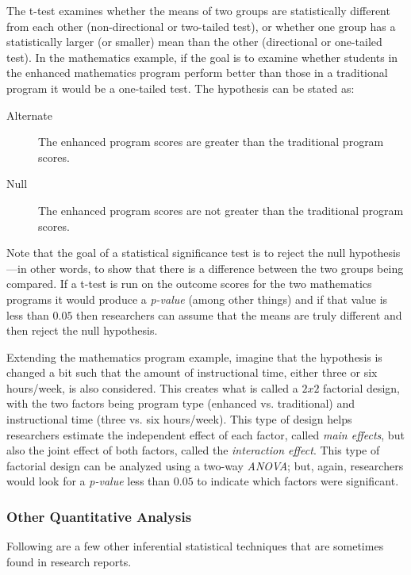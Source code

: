 The t-test examines whether the means of two groups are statistically different from each other (non-directional or two-tailed test), or whether one group has a statistically larger (or smaller) mean than the other (directional or one-tailed test). In the mathematics example, if the goal is to examine whether students in the enhanced mathematics program perform better than those in a traditional program it would be a one-tailed test. The hypothesis can be stated as:

\begin{description}
	\item[Alternate] The enhanced program scores are greater than the traditional program scores.
	\item[Null] The enhanced program scores are not greater than the traditional program scores.
\end{description}

Note that the goal of a statistical significance test is to reject the null hypothesis---in other words, to show that there is a difference between the two groups being compared. If a t-test is run on the outcome scores for the two mathematics programs it would produce a \textit{p-value} (among other things) and if that value is less than $ 0.05 $ then researchers can assume that the means are truly different and then reject the null hypothesis.

Extending the mathematics program example, imagine that the hypothesis is changed a bit such that the amount of instructional time, either three or six hours/week, is also considered. This creates what is called a $ 2 x 2 $ factorial design, with the two factors being program type (enhanced vs. traditional) and instructional time (three vs. six hours/week). This type of design helps researchers estimate the independent effect of each factor, called \textit{main effects}, but also the joint effect of both factors, called the \textit{interaction effect}. This type of factorial design can be analyzed using a two-way \textit{ANOVA}; but, again, researchers would look for a \textit{p-value} less than $ 0.05 $ to indicate which factors were significant.

\subsubsection{Other Quantitative Analysis}

Following are a few other inferential statistical techniques that are sometimes found in research reports.

